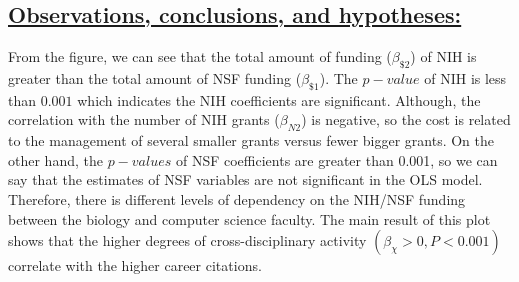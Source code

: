 \documentclass{article}\usepackage[]{graphicx}\usepackage[]{color}
\begin{document}
\subsection*{\underline{Observations, conclusions, and hypotheses:}}
\par{
From the figure, we can see that the total amount of funding ($\beta_{\$2}$) of NIH is greater than the total amount of NSF funding ($\beta_{\$1}$). The $p-value$ of NIH is less than $0.001$ which indicates the NIH coefficients are significant. Although, the correlation with the number of NIH grants ($\beta_{N2}$) is negative, so the cost is related to the management of several smaller grants versus fewer bigger grants. On the other hand, the $p-values$ of NSF coefficients are greater than 0.001, so we can say that the estimates of NSF variables are not significant in the OLS model. Therefore, there is different levels of dependency on the NIH/NSF funding between the biology and computer science faculty. The main result of this plot shows that the higher degrees of cross-disciplinary activity $(\beta_{\chi} > 0, P < 0.001)$ correlate with the higher career citations.
}

\newpage
\end{document}
